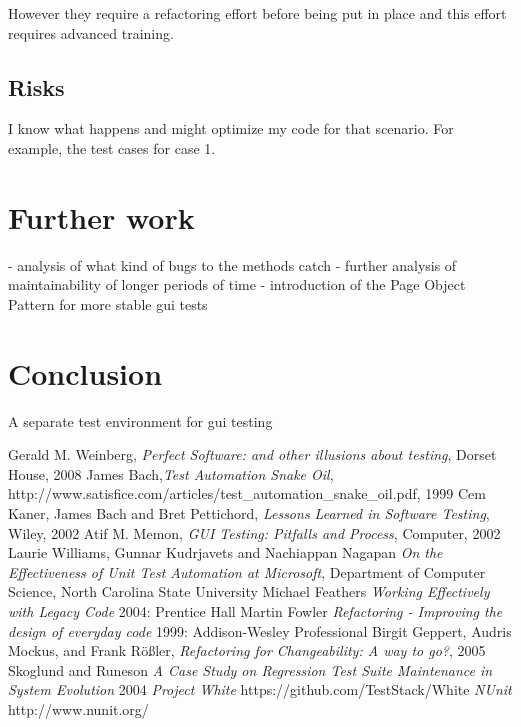 \documentclass{article}
\begin{document}
			However they require a refactoring effort before being put in place and this effort requires advanced training. 

		\subsection{Risks}
		I know what happens and might optimize my code for that scenario. For example, the test cases for case 1. 

	\section{Further work}
	- analysis of what kind of bugs to the methods catch
	- further analysis of maintainability of longer periods of time 
	- introduction of the Page Object Pattern for more stable gui tests

	\section{Conclusion}
		A separate test environment for gui testing

\begin{thebibliography}{1}
 Gerald M. Weinberg, {\em Perfect Software: and other illusions about testing}, Dorset House, 2008
 James Bach,{\em Test Automation Snake Oil}, http://www.satisfice.com/articles/test\_automation\_snake\_oil.pdf, 1999 
 Cem Kaner, James Bach and Bret Pettichord, {\em Lessons Learned in Software Testing}, Wiley, 2002
 Atif M. Memon, {\em GUI Testing: Pitfalls and Process}, Computer, 2002
 Laurie Williams, Gunnar Kudrjavets and Nachiappan Nagapan {\em On the Effectiveness of Unit Test Automation at Microsoft}, Department of Computer Science, North Carolina State University
 Michael Feathers {\em Working Effectively with Legacy Code} 2004: Prentice Hall
 Martin Fowler {\em Refactoring - Improving the design of everyday code} 1999: Addison-Wesley Professional
 Birgit Geppert, Audris Mockus, and Frank Rößler, {\em Refactoring for Changeability: A way to go?}, 2005
 Skoglund and Runeson {\em A Case Study on Regression Test Suite Maintenance in System Evolution} 2004 
 {\em Project White} https://github.com/TestStack/White
 {\em NUnit} http://www.nunit.org/
\end{thebibliography}
\end{document}

